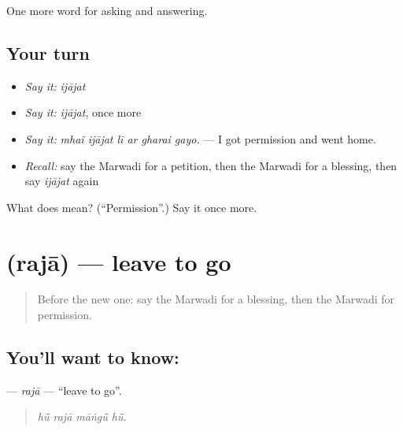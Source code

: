 \begin{grammarlens}[title={What you've built}]
One more word for asking and answering.
\end{grammarlens}

\subsection*{Your turn}
\begin{itemize}
\raggedright
  \item \emph{Say it:} \emph{ijājat}
  \item \emph{Say it:} \emph{ijājat}, once more
  \item \emph{Say it:} \emph{mhaĩ ijājat lī ar gharai gayo.} — I got permission and went home.
  \item \emph{Recall:} say the Marwadi for a petition, then the Marwadi for a blessing, then say \emph{ijājat} again
\end{itemize}

\begin{tcolorbox}[breakable,colback=teal!4,colframe=teal!35!black,title={Before you move on}]
What does  mean? (\textquotedblleft{}Permission\textquotedblright{}.) Say it once more.
\end{tcolorbox}
\section[\texorpdfstring{\mw{रजा} (rajā)}{रजा (rajā)}]{ (rajā) — leave to go}

\label{lesson:MW-C267-raja}



\begin{quote}
Before the new one: say the Marwadi for a blessing, then the Marwadi for permission.
\end{quote}

\subsection*{You'll want to know: }
\textbf{} — \emph{rajā} — \textquotedblleft{}leave to go\textquotedblright{}.

\begin{quote}
   
\end{quote}

\begin{quote}
\emph{hū̃ rajā māṅgū̃ hū̃.}
\end{quote}

